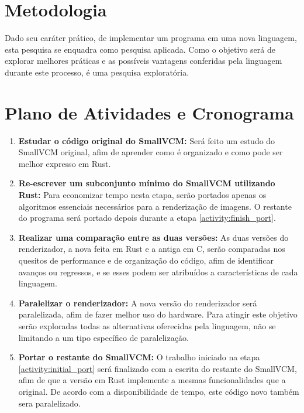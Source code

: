 \documentclass[12pt]{article}
\def\Cpp{{C\nolinebreak[4]\raisebox{.20ex}{\small\bf++}}}
\begin{document}
\section{Metodologia}

Dado seu caráter prático, de implementar um programa em uma nova linguagem, esta pesquisa se
enquadra como pesquisa aplicada. Como o objetivo será de explorar melhores práticas e as possíveis
vantagens conferidas pela linguagem durante este processo, é uma pesquisa exploratória.

\section{Plano de Atividades e Cronograma}

\begin{enumerate}
	\item \label{activity:study} \textbf{Estudar o código original do SmallVCM:}
		Será feito um estudo do SmallVCM original, afim de aprender como é organizado e como pode
		ser melhor expresso em Rust.
	\item \label{activity:initial_port} \textbf{Re-escrever um subconjunto mínimo do SmallVCM utilizando Rust:}
		Para economizar tempo nesta etapa, serão portados apenas os algoritmos essenciais
		necessários para a renderização de imagens. O restante do programa será portado depois
		durante a etapa \ref{activity:finish_port}.
	\item \label{activity:compare} \textbf{Realizar uma comparação entre as duas versões:}
		As duas versões do renderizador, a nova feita em Rust e a antiga em \Cpp, serão comparadas
		nos quesitos de performance e de organização do código, afim de identificar avanços ou
		regressos, e se esses podem ser atribuídos a características de cada linguagem.
	\item \label{activity:parallelize} \textbf{Paralelizar o renderizador:}
		A nova versão do renderizador será paralelizada, afim de fazer melhor uso do hardware. Para
		atingir este objetivo serão exploradas todas as alternativas oferecidas pela linguagem, não
		se limitando a um tipo específico de paralelização.
	\item \label{activity:finish_port} \textbf{Portar o restante do SmallVCM:}
		O trabalho iniciado na etapa \ref{activity:initial_port} será finalizado com a escrita do
		restante do SmallVCM, afim de que a versão em Rust implemente a mesmas funcionalidades que a
		original. De acordo com a disponibilidade de tempo, este código novo também sera
		paralelizado.
\end{enumerate}
\end{document}
